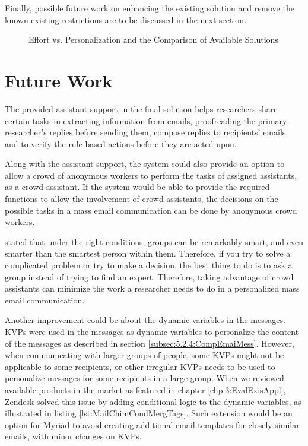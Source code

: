 Finally, possible future work on enhancing the existing solution and remove the known existing restrictions are to be discussed in the next section.

\begin{figure}[htbp]
	\centering
	\begin{pdfpic}
	    
	\end{pdfpic}
	\caption[Effort vs. Personalization and the Comparison of Available Solutions]{Effort vs. Personalization and the Comparison of Available Solutions}
	\label{fig:drawingEfforPersonalizationAnnotations}
\end{figure}

\section{Future Work}
\label{sec:6.2:FutuWork}

The provided assistant support in the final solution helps researchers share certain tasks in extracting information from emails, proofreading the primary researcher's replies before sending them, compose replies to recipients' emails, and to verify the rule-based actions before they are acted upon.
\vspace{1cm}

Along with the assistant support, the system could also provide an option to allow a crowd of anonymous workers to perform the tasks of assigned assistants, as a crowd assistant. If the system would be able to provide the required functions to allow the involvement of crowd assistants, the decisions on the possible tasks in a mass email communication can be done by anonymous crowd workers.
\vspace{1cm}

\cite{Surowiecki2005} stated that under the right conditions, groups can be remarkably smart, and even smarter than the smartest person within them. Therefore, if you try to solve a complicated problem or try to make a decision, the best thing to do is to ask a group instead of trying to find an expert. Therefore, taking advantage of crowd assistants can minimize the work a researcher needs to do in a personalized mass email communication.
\vspace{1cm}

Another improvement could be about the dynamic variables in the messages. \ac{KVP}s were used in the messages as dynamic variables to personalize the content of the messages as described in section \ref{subsec:5.2.4:CompEmaiMess}. However, when communicating with larger groups of people, some \ac{KVP}s might not be applicable to some recipients, or other irregular \ac{KVP}s needs to be used to personalize messages for some recipients in a large group. When we reviewed available products in the market as featured in chapter \ref{chp:3:EvalExisAppl}, Zendesk solved this issue by adding conditional logic to the dynamic variables, as illustrated in listing \ref{lst:MailChimCondMergTags}. Such extension would be an option for Myriad to avoid creating additional email templates for closely similar emails, with minor changes on \ac{KVP}s.
\vspace{1cm}

